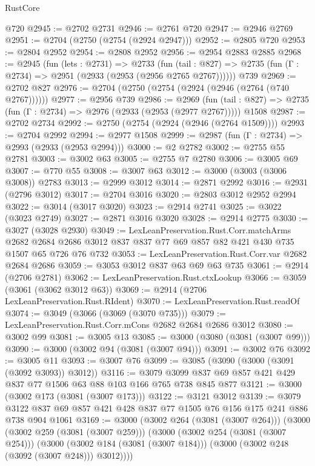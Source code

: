 \begin{lexlean}{RustCore}
\begin{coremodule}
    @720
@2945 := @2702 @2731
@2946 := @2761 @720
@2947 := @2946 @2769
@2951 := @2704 (@2750 (@2754 (@2924 @2947)))
@2952 := @2805 @720
@2953 := @2804 @2952
@2954 := @2808 @2952
@2956 := @2954 @2883 @2885
@2968 := @2945
    (fun (lets : @2731) =>
    @2733
      (fun (tail : @827) => @2735 (fun (Γ : @2734) => @2951 (@2933 (@2953 (@2956 @2765 @2767))))))
    @739
@2969 := @2702 @827
@2976 := @2704 (@2750 (@2754 (@2924 (@2946 (@2764 (@740 @2767))))))
@2977 := @2956 @739
@2986 := @2969
    (fun (tail : @827) => @2735 (fun (Γ : @2734) => @2976 (@2933 (@2953 (@2977 @2767)))))
    @1508
@2987 := @2702 @2734
@2992 := @2750 (@2754 (@2924 (@2946 (@2764 @1509))))
@2993 := @2704 @2992
@2994 := @2977 @1508
@2999 := @2987 (fun (Γ : @2734) => @2993 (@2933 (@2953 @2994)))
@3000 := @2 @2782
@3002 := @2755 @55 @2781
@3003 := @3002 @63
@3005 := @2755 @7 @2780
@3006 := @3005 @69
@3007 := @770 @55
@3008 := @3007 @63
@3012 := @3000 (@3003 (@3006 @3008)) @2783
@3013 := @2999 @3012
@3014 := @2871 @2992
@3016 := @2931 (@2796 @3012)
@3017 := @2704 @3016
@3020 := @2803 @3012 @2952 @2994
@3022 := @3014 (@3017 @3020)
@3023 := @2914 @2741
@3025 := @3022 (@3023 @2749)
@3027 := @2871 @3016 @3020
@3028 := @2914 @2775
@3030 := @3027 (@3028 @2930)
@3049 := LexLeanPreservation.Rust.Corr.matchArms
    @2682
    @2684
    @2686
    @3012
    @837
    @837
    @77
    @69
    @857
    @82
    @421
    @430
    @735
    @1507
    @65
    @726
    @76
    @732
@3053 := LexLeanPreservation.Rust.Corr.var @2682 @2684 @2686
@3059 := @3053 @3012 @837 @63 @69 @63 @735
@3061 := @2914 (@2706 @2781)
@3062 := LexLeanPreservation.Rust.ctxLookup
@3066 := @3059 (@3061 (@3062 @3012 @63))
@3069 := @2914 (@2706 LexLeanPreservation.Rust.RIdent)
@3070 := LexLeanPreservation.Rust.readOf
@3074 := @3049 (@3066 (@3069 (@3070 @735)))
@3079 := LexLeanPreservation.Rust.Corr.mCons @2682 @2684 @2686 @3012
@3080 := @3002 @99
@3081 := @3005 @13
@3085 := @3000 (@3080 (@3081 (@3007 @99)))
@3090 := @3000 (@3002 @94 (@3081 (@3007 @94)))
@3091 := @3002 @76
@3092 := @3005 @11
@3093 := @3007 @76
@3099 := @3085 (@3090 (@3000 (@3091 (@3092 @3093)) @3012))
@3116 := @3079 @3099 @837 @69 @857 @421 @429 @837 @77 @1506 @63 @88 @103 @166 @765 @738 @845 @877
@3121 := @3000 (@3002 @173 (@3081 (@3007 @173)))
@3122 := @3121 @3012
@3139 := @3079 @3122 @837 @69 @857 @421 @428 @837 @77 @1505 @76 @156 @175 @241 @886 @738 @904 @1061
@3169 := @3000
    (@3002 @264 (@3081 (@3007 @264)))
    (@3000
      (@3002 @259 (@3081 (@3007 @259)))
      (@3000
        (@3002 @254 (@3081 (@3007 @254)))
        (@3000 (@3002 @184 (@3081 (@3007 @184))) (@3000 (@3002 @248 (@3092 (@3007 @248))) @3012))))

\end{coremodule}
\end{lexlean}
